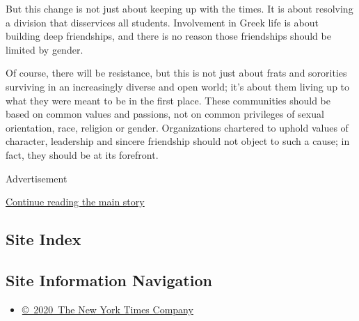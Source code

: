 But this change is not just about keeping up with the times. It is about
resolving a division that disservices all students. Involvement in Greek
life is about building deep friendships, and there is no reason those
friendships should be limited by gender.

Of course, there will be resistance, but this is not just about frats
and sororities surviving in an increasingly diverse and open world; it's
about them living up to what they were meant to be in the first place.
These communities should be based on common values and passions, not on
common privileges of sexual orientation, race, religion or gender.
Organizations chartered to uphold values of character, leadership and
sincere friendship should not object to such a cause; in fact, they
should be at its forefront.

Advertisement

\protect\hyperlink{after-bottom}{Continue reading the main story}

\hypertarget{site-index}{%
\subsection{Site Index}\label{site-index}}

\hypertarget{site-information-navigation}{%
\subsection{Site Information
Navigation}\label{site-information-navigation}}

\begin{itemize}
\tightlist
\item
  \href{https://help.nytimes.com/hc/en-us/articles/115014792127-Copyright-notice}{©~2020~The
  New York Times Company}
\end{itemize}

